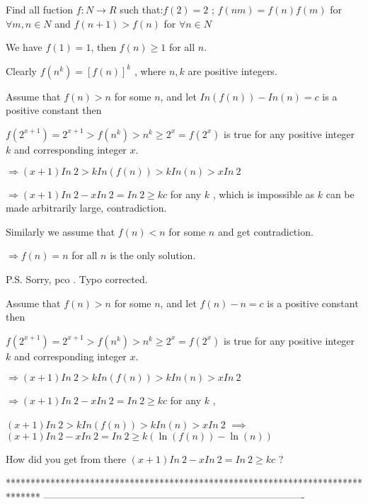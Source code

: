 \begin{solution}
	\begin{tcolorbox}Find all fuction $ f: N\longrightarrow R$ such that:$ f(2) = 2$ ; $ f(nm) = f(n)f(m)$ for $ \forall m,n\in N$ and $ f(n + 1) > f(n)$ for $ \forall n\in N$\end{tcolorbox}


We have $ f(1) = 1$, then $ f(n) \ge 1$ for all $ n$.

Clearly $ f(n^k) = [f(n)]^k$ , where $ n,k$ are positive integers.


Assume that $ f(n) > n$ for some $ n$, and let $ In(f(n)) - In(n) = c$ is a positive constant then

$ f(2^{x + 1}) = 2^{x + 1} > f(n^k) > n^k \ge 2^{x} = f(2^x)$ is true for any positive integer $ k$ and corresponding integer $ x$.

$ \Rightarrow (x + 1)In \ 2 > k In (f(n)) > k In (n) > x In \ 2$

$ \Rightarrow (x + 1) In \ 2 - x In \ 2 = In \ 2 \ge kc$ for any $ k$ , which is impossible as $ k$ can be made arbitrarily large, contradiction.

Similarly we assume that $ f(n) < n$ for some $ n$ and get contradiction.

$ \Rightarrow f(n) = n$ for all $ n$ is the only solution.

P.S. Sorry, pco . Typo corrected.
\end{solution}



\begin{solution}
	\begin{tcolorbox} Assume that $ f(n) > n$ for some $ n$, and let $ f(n) - n = c$ is a positive constant then

$ f(2^{x + 1}) = 2^{x + 1} > f(n^k) > n^k \ge 2^{x} = f(2^x)$ is true for any positive integer $ k$ and corresponding integer $ x$.

$ \Rightarrow (x + 1)In \ 2 > k In (f(n)) > k In (n) > x In \ 2$

$ \Rightarrow (x + 1) In \ 2 - x In \ 2 = In \ 2 \ge kc$ for any $ k$ , \end{tcolorbox}

$ (x + 1)In \ 2 > k In (f(n)) > k In (n) > x In \ 2$ $ \implies$ $ (x + 1) In \ 2 - x In \ 2 = In \ 2 \ge k(\ln(f(n))-\ln(n))$

How did you get from there $ (x + 1) In \ 2 - x In \ 2 = In \ 2 \ge kc$ ?
\end{solution}
*******************************************************************************
-------------------------------------------------------------------------------


